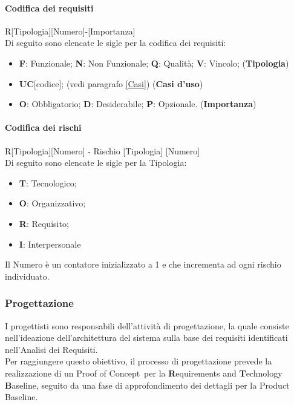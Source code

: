 \paragraph{Codifica dei requisiti}

R[Tipologia][Numero]-[Importanza] \\
Di seguito sono elencate le sigle per la codifica dei requisiti: 
\begin{itemize}
    \item \textbf{F}: Funzionale; \textbf{N}: Non Funzionale; \textbf{Q}: Qualità; \textbf{V}: Vincolo; (\textbf{Tipologia})
    \item \textbf{UC}[codice]; (vedi paragrafo \ref{Casi}) (\textbf{Casi d'uso})
    \item \textbf{O}: Obbligatorio; \textbf{D}: Desiderabile; \textbf{P}: Opzionale. (\textbf{Importanza})
\end{itemize}

\paragraph{Codifica dei rischi}\label{codRischi}

R[Tipologia][Numero] - Rischio [Tipologia] [Numero] \\
Di seguito sono elencate le sigle per la Tipologia: 
\begin{itemize}
    \item \textbf{T}: Tecnologico;
    \item \textbf{O}: Organizzativo;
    \item \textbf{R}: Requisito;
    \item \textbf{I}: Interpersonale
\end{itemize}
Il Numero è un contatore inizializzato a 1 e che incrementa ad ogni rischio individuato.

\subsubsection{Progettazione}\label{Prog}
I progettisti sono responsabili dell'attività di progettazione, la quale consiste nell'ideazione dell'architettura del sistema sulla base dei requisiti 
identificati nell'Analisi dei Requisiti. \\
Per raggiungere questo obiettivo, il processo di progettazione prevede la realizzazione di un Proof of Concept\glo\ 
per la \textbf{R}equirements and \textbf{T}echnology \textbf{B}aseline, seguito da una fase di approfondimento dei dettagli per la Product Baseline.



